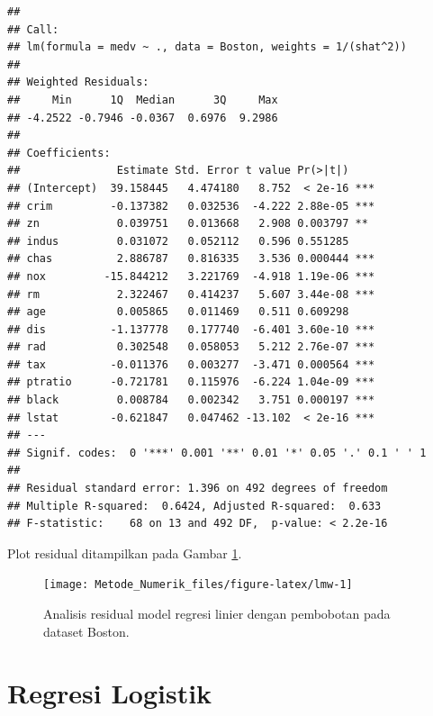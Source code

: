 \documentclass[]{book}
\theoremstyle{definition}
\theoremstyle{definition}
\theoremstyle{definition}
\theoremstyle{remark}
\begin{document}
\begin{verbatim}
## 
## Call:
## lm(formula = medv ~ ., data = Boston, weights = 1/(shat^2))
## 
## Weighted Residuals:
##     Min      1Q  Median      3Q     Max 
## -4.2522 -0.7946 -0.0367  0.6976  9.2986 
## 
## Coefficients:
##               Estimate Std. Error t value Pr(>|t|)    
## (Intercept)  39.158445   4.474180   8.752  < 2e-16 ***
## crim         -0.137382   0.032536  -4.222 2.88e-05 ***
## zn            0.039751   0.013668   2.908 0.003797 ** 
## indus         0.031072   0.052112   0.596 0.551285    
## chas          2.886787   0.816335   3.536 0.000444 ***
## nox         -15.844212   3.221769  -4.918 1.19e-06 ***
## rm            2.322467   0.414237   5.607 3.44e-08 ***
## age           0.005865   0.011469   0.511 0.609298    
## dis          -1.137778   0.177740  -6.401 3.60e-10 ***
## rad           0.302548   0.058053   5.212 2.76e-07 ***
## tax          -0.011376   0.003277  -3.471 0.000564 ***
## ptratio      -0.721781   0.115976  -6.224 1.04e-09 ***
## black         0.008784   0.002342   3.751 0.000197 ***
## lstat        -0.621847   0.047462 -13.102  < 2e-16 ***
## ---
## Signif. codes:  0 '***' 0.001 '**' 0.01 '*' 0.05 '.' 0.1 ' ' 1
## 
## Residual standard error: 1.396 on 492 degrees of freedom
## Multiple R-squared:  0.6424, Adjusted R-squared:  0.633 
## F-statistic:    68 on 13 and 492 DF,  p-value: < 2.2e-16
\end{verbatim}

Plot residual ditampilkan pada Gambar \ref{fig:lmw}.

\begin{figure}

{\centering \texttt{[image: Metode\_Numerik\_files/figure-latex/lmw-1]} 

}

\caption{Analisis residual model regresi linier dengan pembobotan pada dataset Boston.}\label{fig:lmw}
\end{figure}

\hypertarget{logreg}{%
\section{Regresi Logistik}\label{logreg}}


\end{document}
